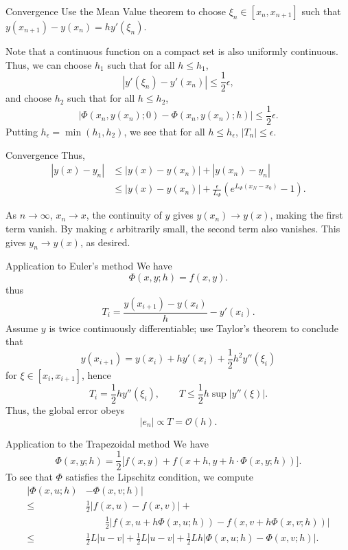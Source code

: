 \documentclass{beamer}
\begin{document}
    \begin{frame}{Convergence}
        Use the Mean Value theorem to choose $\xi_n \in [x_n, x_{n + 1}]$ such that
        $y(x_{n + 1}) - y(x_n) = hy'(\xi_n)$.

        Note that a continuous function on a compact set is also uniformly
        continuous. Thus, we can choose $h_1$ such that for all $h \leq h_1$, \[
            |y'(\xi_n) - y'(x_n)| \leq \frac{1}{2}\epsilon,
        \] and choose $h_2$ such that for all $h \leq h_2$, \[
            |\Phi(x_n, y(x_n); 0) - \Phi(x_n, y(x_n); h)| \leq \frac{1}{2}\epsilon.
        \] Putting $h_\epsilon = \min(h_1, h_2)$, we see that for all $h \leq
        h_\epsilon$, $|T_n| \leq \epsilon$.
    \end{frame}

    \begin{frame}{Convergence}
        Thus, \begin{align*}
            |y(x) - y_n| &\leq |y(x) - y(x_n)| + |y(x_n) - y_n| \\
            &\leq |y(x) - y(x_n)| + \frac{\epsilon}{L_\Phi}\left(e^{L_\Phi(x_N -
            x_0)} - 1\right).
        \end{align*}

        As $n \to \infty$, $x_n \to x$, the continuity of $y$ gives $y(x_n) \to
        y(x)$, making the first term vanish. By making $\epsilon$ arbitrarily small,
        the second term also vanishes. This gives $y_n \to y(x)$, as desired.
    \end{frame}

    \begin{frame}{Application to Euler's method}
        We have \[
            \Phi(x, y; h) = f(x, y).
        \] thus \[
            T_i = \frac{y(x_{i + 1}) - y(x_i)}{h} - y'(x_i).
        \] Assume $y$ is twice continuously differentiable; use Taylor's theorem to
        conclude that \[
            y(x_{i + 1}) = y(x_i) + hy'(x_i) + \frac{1}{2}h^2y''(\xi_i)
        \] for $\xi \in [x_{i}, x_{i + 1}]$, hence \[
            T_i = \frac{1}{2}hy''(\xi_i), \qquad T \leq \frac{1}{2}h\sup|y''(\xi)|.
        \] Thus, the global error obeys \[
            |e_n| \propto T = \mathcal{O}(h).
        \] 
    \end{frame}

    \begin{frame}{Application to the Trapezoidal method}
        We have \[
            \Phi(x, y; h) = \frac{1}{2}\Big[f(x, y) + f(x + h, y + h\cdot \Phi(x, y;
            h))\Big].
        \] To see that $\Phi$ satisfies the Lipschitz condition, we compute 
        \begin{align*}
            |\Phi(x, u; h) &- \Phi(x, v; h)| \\
            \leq& \frac{1}{2}|f(x, u) - f(x, v)| + \\
            &\qquad \frac{1}{2}|f(x, u + h\Phi(x, u; h)) - f(x, v + h\Phi(x, v; h))| \\
            \leq& \frac{1}{2}L|u - v| + \frac{1}{2}L|u - v| +
            \frac{1}{2}Lh|\Phi(x, u; h) - \Phi(x, v; h)|.
        \end{align*}
    \end{frame}
\end{document}
